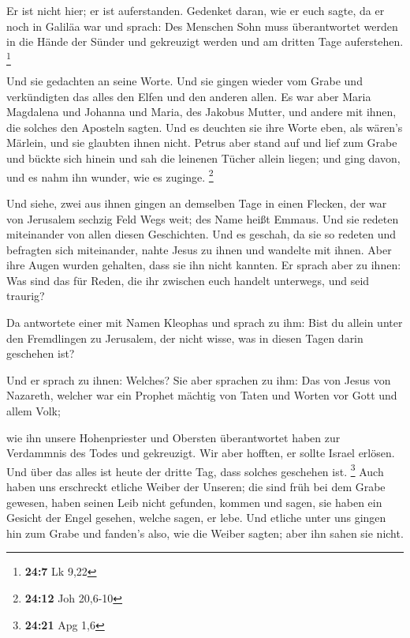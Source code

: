  Er ist nicht hier; er ist auferstanden. Gedenket daran, wie
er euch sagte, da er noch in Galiläa war  und sprach: Des
Menschen Sohn muss überantwortet werden in die Hände der Sünder und
gekreuzigt werden und am dritten Tage auferstehen. \footnote{\textbf{24:7}
  Lk 9,22}

 Und sie gedachten an seine Worte.  Und sie
gingen wieder vom Grabe und verkündigten das alles den Elfen und den
anderen allen.  Es war aber Maria Magdalena und Johanna und
Maria, des Jakobus Mutter, und andere mit ihnen, die solches den
Aposteln sagten.  Und es deuchten sie ihre Worte eben, als
wären's Märlein, und sie glaubten ihnen nicht.  Petrus aber
stand auf und lief zum Grabe und bückte sich hinein und sah die leinenen
Tücher allein liegen; und ging davon, und es nahm ihn wunder, wie es
zuginge. \footnote{\textbf{24:12} Joh 20,6-10}

 Und siehe, zwei aus ihnen gingen an demselben Tage in
einen Flecken, der war von Jerusalem sechzig Feld Wegs weit; des Name
heißt Emmaus.  Und sie redeten miteinander von allen diesen
Geschichten.  Und es geschah, da sie so redeten und
befragten sich miteinander, nahte Jesus zu ihnen und wandelte mit ihnen.
 Aber ihre Augen wurden gehalten, dass sie ihn nicht
kannten.  Er sprach aber zu ihnen: Was sind das für Reden,
die ihr zwischen euch handelt unterwegs, und seid traurig?

 Da antwortete einer mit Namen Kleophas und sprach zu ihm:
Bist du allein unter den Fremdlingen zu Jerusalem, der nicht wisse, was
in diesen Tagen darin geschehen ist?

 Und er sprach zu ihnen: Welches? Sie aber sprachen zu ihm:
Das von Jesus von Nazareth, welcher war ein Prophet mächtig von Taten
und Worten vor Gott und allem Volk;

 wie ihn unsere Hohenpriester und Obersten überantwortet
haben zur Verdammnis des Todes und gekreuzigt.  Wir aber
hofften, er sollte Israel erlösen. Und über das alles ist heute der
dritte Tag, dass solches geschehen ist. \footnote{\textbf{24:21} Apg 1,6}
 Auch haben uns erschreckt etliche Weiber der Unseren; die
sind früh bei dem Grabe gewesen,  haben seinen Leib nicht
gefunden, kommen und sagen, sie haben ein Gesicht der Engel gesehen,
welche sagen, er lebe.  Und etliche unter uns gingen hin
zum Grabe und fanden's also, wie die Weiber sagten; aber ihn sahen sie
nicht.

